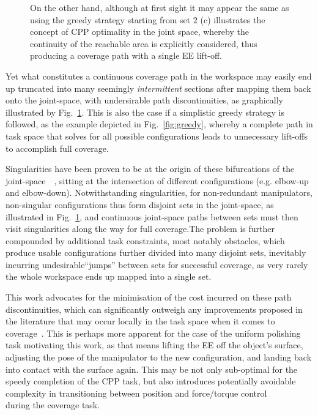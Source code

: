 \documentclass[journal]{IEEEtran}
\begin{document}
\begin{figure}[t]
{On the other hand, although at first sight it may appear the same as using the greedy strategy starting from set $2$ (c) illustrates the concept of CPP optimality in the joint space, whereby the continuity of the reachable area is explicitly considered, thus producing a coverage path with a single EE lift-off.} 
\label{fig1}
\end{figure}

\newpage
Yet what constitutes a continuous coverage path in the workspace may easily end up truncated into many seemingly \textit{intermittent} sections after mapping them back onto the joint-space, with undersirable path discontinuities, as graphically illustrated by Fig.~\ref{fig1}. This is also the case if a simplistic greedy strategy is followed, as the example depicted in Fig.~\ref{fig:greedy}, whereby a complete path in task space that solves for all possible configurations leads to unnecessary lift-offs to accomplish full coverage. 

Singularities have been proven to be at the origin of these bifurcations of the joint-space~\cite{porta2010path}~\cite{Porta2012Randomized}, sitting at the intersection of different configurations (e.g. elbow-up and elbow-down).
Notwithstanding singularities, for non-redundant manipulators, non-singular configurations thus form disjoint sets in the joint-space, as illustrated in Fig.~\ref{fig1}, and continuous joint-space paths between sets must then visit singularities along the way for full coverage.The problem is further compounded by additional task constraints, most notably obstacles, which produce usable configurations further divided into many disjoint sets, inevitably incurring undesirable``jumps'' between sets for successful coverage, as very rarely the whole workspace ends up mapped into a single set.  

This work advocates for the minimisation of the cost incurred on these path discontinuities, which can significantly 
outweigh any improvements proposed in the literature that may occur locally in the task space when it comes 
to coverage~\cite{hassan2018a}. This is perhaps more apparent for the case of the uniform polishing task motivating this work, 
as that means lifting the EE off the object's surface, adjusting the pose of the manipulator to the new configuration, and landing back into contact with the surface again.
This may be not only sub-optimal for the speedy completion of the CPP task, but also introduces potentially avoidable complexity in transitioning between position and force/torque control~\cite{cheah2003brief}~\cite{heck2015switched}~\cite{mirrazavi2018a}~\cite{solanes2018adaptive}~\cite{solanes2019robust} %
during the coverage task. 
 
\end{document}
